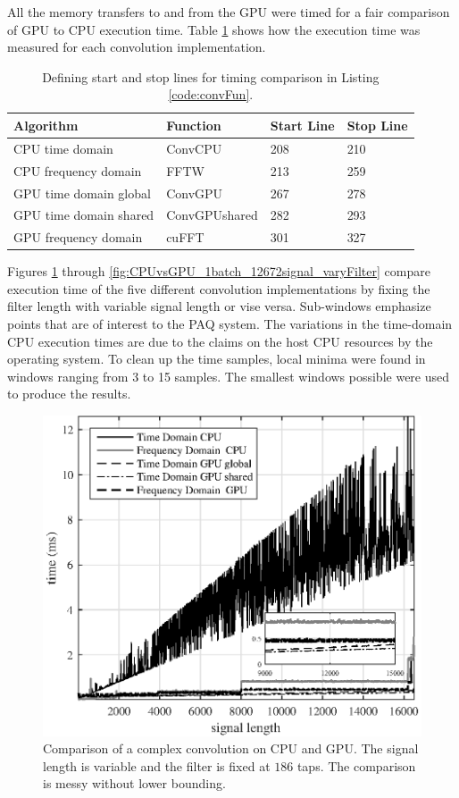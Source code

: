 All the memory transfers to and from the GPU were timed for a fair comparison of GPU to CPU execution time.
Table \ref{tab:CPUvsGPUtimingTable} shows how the execution time was measured for each convolution implementation.
\begin{table}
\captionsetup{width=6in}
\caption{Defining start and stop lines for timing comparison in Listing \ref{code:convFun}.}
\begin{center}
\begin{tabular}{llll}
	\toprule
	Algorithm 				& Function		& Start Line	& Stop  Line		\\ \midrule
	CPU time domain 		& ConvCPU 		& 208			& 210 				\\
	CPU frequency domain 	& FFTW 			& 213			& 259 				\\
	GPU time domain global 	& ConvGPU 		& 267			& 278				\\
	GPU time domain shared 	& ConvGPUshared & 282			& 293				\\
	GPU frequency domain 	& cuFFT			& 301			& 327				\\ 
	\bottomrule
\end{tabular}
\end{center}
\label{tab:CPUvsGPUtimingTable}
\end{table}
Figures \ref{fig:CPUvsGPU_1batch_186taps_varySignal_noMin} through \ref{fig:CPUvsGPU_1batch_12672signal_varyFilter} compare execution time of the five different convolution implementations by fixing the filter length with variable signal length or vise versa.
Sub-windows emphasize points that are of interest to the PAQ system.
The variations in the time-domain CPU execution times are due to the claims on the host CPU resources by the operating system.
To clean up the time samples, local minima were found in windows ranging from 3 to 15 samples.
The smallest windows possible were used to produce the results.
\begin{figure}
	\centering\includegraphics[width=5in]{figures/gpu_intro/CPUvsGPU_1batch_186taps_varySignal_noMin.eps}
	\caption{Comparison of a complex convolution on CPU and GPU. The signal length is variable and the filter is fixed at $186$ taps. The comparison is messy without lower bounding.}
	\label{fig:CPUvsGPU_1batch_186taps_varySignal_noMin}
\end{figure}
